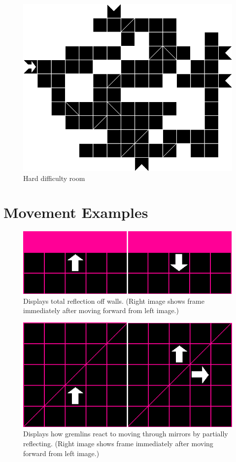 \documentclass{scrreprt}
\begin{document}
		\begin{figure}[!ht]
			\centering
			\includegraphics[width=\columnwidth]{hard}
			\caption{Hard difficulty room}
			\label{fig:hard}
		\end{figure}
	
	\chapter{Movement Examples}\label{chp:movements}
	
		\begin{figure}[!ht]
			\centering
			\includegraphics[width=\columnwidth]{wall}
			\caption{Displays total reflection off walls. (Right image shows frame immediately after moving forward from left image.)}
			\label{fig:wall}
		\end{figure}
	
		\begin{figure}[!ht]
			\centering
			\includegraphics[width=\columnwidth]{mirror}
			\caption{Displays how gremlins react to moving through mirrors by partially reflecting. (Right image shows frame immediately after moving forward from left image.)}
			\label{fig:mirror}
		\end{figure}
	
\end{document}

